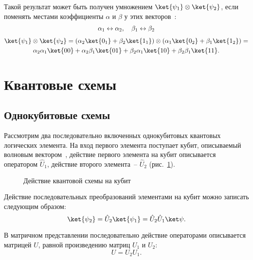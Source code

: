 \documentclass[pscyr,notitlepage]{hedwork}
\newcommand{\pic}[1]{\ref{pic:#1}}
\renewcommand{\~}[1]{\widetilde{#1}}
\newcommand{\lb}{\left(}
\newcommand{\rb}{\right)}
\begin{document}
  Такой результат может быть получен умножением
  \( \ket{\psi_1} \otimes \ket{\psi_2} \), если поменять местами коэффициенты
  \( \alpha \) и \( \beta \) у этих векторов~\cite{task}:
  \begin{gather*}
    \alpha_1 \leftrightarrow \alpha_2, \quad
      \beta_1 \leftrightarrow \beta_2 \\[1ex]
    \ket{\psi_1} \otimes \ket{\psi_2} =
      \lb\alpha_2\ket{0_1} + \beta_2\ket{1_1}\rb \otimes
      \lb\alpha_1\ket{0_2} + \beta_1\ket{1_2}\rb = \\
      \alpha_2\alpha_1\ket{00} + \alpha_2\beta_1\ket{01} +
      \beta_2\alpha_1\ket{10} + \beta_2\beta_1\ket{11}.
  \end{gather*}
  
  \newpage
  \section{Квантовые схемы}
  
  \subsection{Однокубитовые схемы}
  
  Рассмотрим два последовательно включенных однокубитовых квантовых логических
  элемента. На вход первого элемента поступает кубит, описываемый волновым
  вектором~\ket{\psi}, действие первого элемента на кубит описывается
  оператором \( \hat{U}_1 \), действие второго элемента~-- \( \hat{U}_2 \)
  (рис.~\pic{19}).
  \begin{figure}[h!]
    \center
    \caption{Действие квантовой схемы на кубит}
    \label{pic:19}
  \end{figure}
  
  Действие последовательных преобразований элементами на кубит можно записать
  следующим образом:
  \[
    \ket{\psi_2} = \hat{U}_2\ket{\psi_1} = \hat{U}_2\hat{U}_1\ket\psi.
  \]
  
  В матричном представлении последовательно действие операторами описывается
  матрицей \( U \), равной произведению матриц \( U_1 \) и \( U_2 \):
  \[
    U = U_2 U_1.
  \]
  
\end{document}
